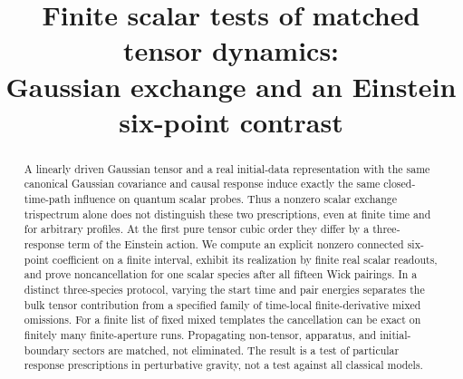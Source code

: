 \documentclass[11pt]{article}
\title{Finite scalar tests of matched tensor dynamics:\\
Gaussian exchange and an Einstein six-point contrast}
\author{}
\date{}
\begin{document}
\maketitle
\begin{abstract}
A linearly driven Gaussian tensor and a real initial-data representation with the same canonical Gaussian covariance and causal response induce exactly the same closed-time-path influence on quantum scalar probes. Thus a nonzero scalar exchange trispectrum alone does not distinguish these two prescriptions, even at finite time and for arbitrary profiles. At the first pure tensor cubic order they differ by a three-response term of the Einstein action. We compute an explicit nonzero connected six-point coefficient on a finite interval, exhibit its realization by finite real scalar readouts, and prove noncancellation for one scalar species after all fifteen Wick pairings. In a distinct three-species protocol, varying the start time and pair energies separates the bulk tensor contribution from a specified family of time-local finite-derivative mixed omissions. For a finite list of fixed mixed templates the cancellation can be exact on finitely many finite-aperture runs. Propagating non-tensor, apparatus, and initial-boundary sectors are matched, not eliminated. The result is a test of particular response prescriptions in perturbative gravity, not a test against all classical models.
\end{abstract}
\end{document}
